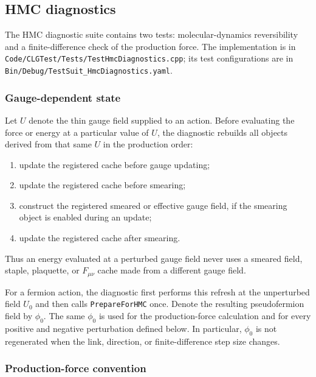 \subsection{\label{sec:hmcdiag}HMC diagnostics}

The HMC diagnostic suite contains two tests: molecular-dynamics
reversibility and a finite-difference check of the production force.  The
implementation is in
\texttt{Code/CLGTest/Tests/TestHmcDiagnostics.cpp}; its test configurations
are in \texttt{Bin/Debug/TestSuit\_HmcDiagnostics.yaml}.

\subsubsection{\label{sec:hmcdiag_state}Gauge-dependent state}

Let $U$ denote the thin gauge field supplied to an action.  Before evaluating
the force or energy at a particular value of $U$, the diagnostic rebuilds all
objects derived from that same $U$ in the production order:
\begin{enumerate}
  \item update the registered cache before gauge updating;
  \item update the registered cache before smearing;
  \item construct the registered smeared or effective gauge field, if the
        smearing object is enabled during an update;
  \item update the registered cache after smearing.
\end{enumerate}
Thus an energy evaluated at a perturbed gauge field never uses a smeared field,
staple, plaquette, or $F_{\mu\nu}$ cache made from a different gauge field.

For a fermion action, the diagnostic first performs this refresh at the
unperturbed field $U_0$ and then calls \texttt{PrepareForHMC} once.  Denote the
resulting pseudofermion field by $\phi_0$.  The same $\phi_0$ is used for the
production-force calculation and for every positive and negative perturbation
defined below.  In particular, $\phi_0$ is not regenerated when the link,
direction, or finite-difference step size changes.

\subsubsection{\label{sec:hmcdiag_force}Production-force convention}

